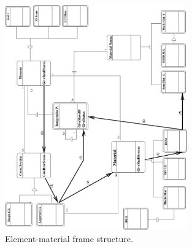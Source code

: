 \documentclass[a4paper]{article}
\begin{document}
\begin{figure}[tb]
\centerline{\includegraphics[width=0.7\textwidth]{struct1.eps}}
\fi
\caption{Element-material frame  structure.}
\label{materelementFrame1}
\end{figure}
\end{document}
